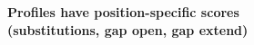 \begin{slide}
\begin{center}
\textbf{Profiles have position-specific scores \\ (substitutions, gap
    open, gap extend)}
\end{center}


\vfill
\end{slide}
